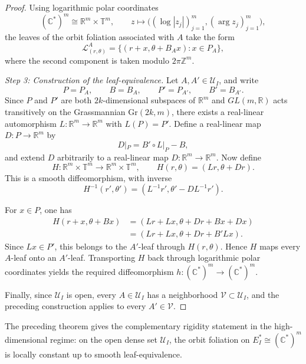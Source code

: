\documentclass[11pt]{amsart}
\theoremstyle{definition}
\theoremstyle{remark}
\newcommand{\Z}{\mathbb{Z}}
\newcommand{\C}{\mathbb{C}}
\newcommand{\R}{\mathbb{R}}
\newcommand{\T}{\mathbb{T}}
\newcommand{\stratSS}[1]{E_{#1}^*}
\newcommand{\stratS}[1]{\stratSS{#1}}
\begin{document}
\begin{proof}

Using logarithmic polar coordinates
\[
    (\C^*)^m\cong\R^m\times\T^m,
    \qquad
    z\longmapsto
    \bigl((\log|z_j|)_{j=1}^m,(\arg z_j)_{j=1}^m\bigr),
\]
the leaves of the orbit foliation associated with $A$ take the form
\[
    \mathcal L^A_{(r,\theta)}
    =
    \{(r+x,\theta+B_Ax):x\in P_A\},
\]
where the second component is taken modulo $2\pi\Z^m$.

	\smallskip
	\noindent\emph{Step 3: Construction of the leaf-equivalence.}
	Let $A,A'\in\mathcal U_I$, and write
	\[
		P=P_A,\qquad B=B_A,\qquad P'=P_{A'},\qquad B'=B_{A'}.
	\]
	Since $P$ and $P'$ are both $2k$-dimensional subspaces of $\R^m$ and
	$GL(m,\R)$ acts transitively on the Grassmannian $\mathrm{Gr}(2k,m)$,
	there exists a real-linear automorphism $L:\R^m\to\R^m$ with $L(P)=P'$.
	Define a real-linear map $D:P\to\R^m$ by
	\[
		D|_P=B'\circ L|_P-B,
	\]
	and extend $D$ arbitrarily to a real-linear map $D:\R^m\longrightarrow\R^m$.
	Now define
	\[
		H:\R^m\times\T^m\longrightarrow\R^m\times\T^m, \qquad H(r,\theta)=(Lr,\theta+Dr).
	\]
	This is a smooth diffeomorphism, with inverse
	\[
		H^{-1}(r',\theta') = \left(L^{-1}r',\theta'-DL^{-1}r'\right).
	\]

	For $x\in P$, one has
	\[
		\begin{aligned}
			H(r+x,\theta+Bx) & =(Lr+Lx,\theta+Dr+Bx+Dx) \\ &=(Lr+Lx,\theta+Dr+B'Lx).
		\end{aligned}
	\]
	Since $Lx\in P'$, this belongs to the $A'$-leaf through $H(r,\theta)$.
	Hence $H$ maps every $A$-leaf onto an $A'$-leaf.
	Transporting $H$ back through logarithmic polar coordinates yields the required diffeomorphism $h:(\C^*)^m\to(\C^*)^m$.

	Finally, since $\mathcal U_I$ is open, every $A\in\mathcal U_I$ has a neighborhood $\mathcal V\subset\mathcal U_I$, and the preceding construction applies to every $A'\in\mathcal V$.
\end{proof}

The preceding theorem gives the complementary rigidity statement in the high-dimensional regime: on the open dense set $\mathcal U_I$, the orbit foliation on $\stratS{I}\cong(\C^*)^m$ is locally constant up to smooth leaf-equivalence.
\end{document}
